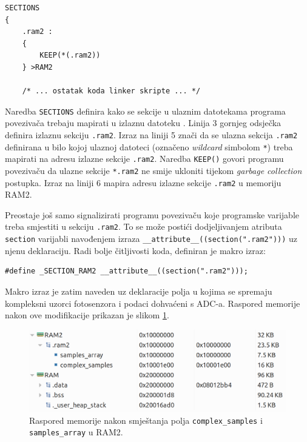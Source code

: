 \begin{lstlisting}
SECTIONS
{
    .ram2 :
    {
        KEEP(*(.ram2))
    } >RAM2

    /* ... ostatak koda linker skripte ... */
\end{lstlisting}

Naredba \texttt{SECTIONS} definira kako se sekcije u ulaznim datotekama programa povezivača trebaju mapirati u izlaznu datoteku \cite{ld_dokumentacija}. Linija 3 gornjeg odsječka definira izlaznu sekciju \texttt{.ram2}. Izraz na liniji 5 znači da se ulazna sekcija \texttt{.ram2} definirana u bilo kojoj ulaznoj datoteci (označeno \textit{wildcard} simbolom \texttt{*}) treba mapirati na adresu izlazne sekcije \texttt{.ram2}. Naredba \texttt{KEEP()} govori programu povezivaču da ulazne sekcije \texttt{*.ram2} ne smije ukloniti tijekom \textit{garbage collection} postupka. Izraz na liniji 6 mapira adresu izlazne sekcije \texttt{.ram2} u memoriju RAM2.

Preostaje još samo signalizirati programu povezivaču koje programske varijable treba smjestiti u sekciju \texttt{.ram2}. To se može postići dodjeljivanjem atributa \texttt{section} varijabli navođenjem izraza \texttt{\_\_attribute\_\_((section(".ram2")))} uz njenu deklaraciju. Radi bolje čitljivosti koda, definiran je makro izraz:

\begin{lstlisting}
#define _SECTION_RAM2 __attribute__((section(".ram2")));
\end{lstlisting}

Makro izraz je zatim naveden uz deklaracije polja u kojima se spremaju kompleksni uzorci fotosenzora i podaci dohvaćeni s ADC-a. Raspored memorije nakon ove modifikacije prikazan je slikom \ref{fig:memorija}.

\begin{figure}[htb]
    \centering
    \includegraphics[width=\textwidth]{slike/memorija.png}
    \caption{Raspored memorije nakon smještanja polja \texttt{complex\_samples} i \texttt{samples\_array} u RAM2.}
    \label{fig:memorija}
\end{figure}